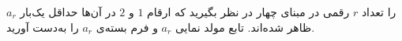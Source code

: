     \p 
$a_r$
را تعداد
$r$
رقمی در مبنای چهار در نظر بگیرید که ارقام
$1$
و
$2$
در آن‌ها حداقل یک‌بار ظاهر شده‌اند. تابع مولد نمایی
$a_r$
و فرم بسته‌ی
$a_r$
را به‌دست آورید.